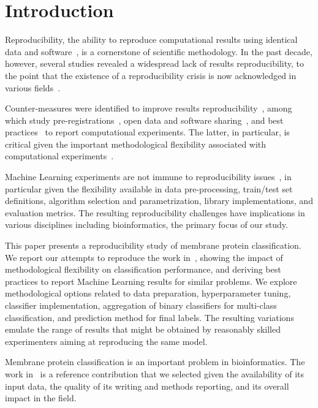 \section {Introduction}


Reproducibility, the ability to reproduce computational results using
identical data and software~\cite{peng2011reproducible}, is a cornerstone
of scientific methodology. In the past decade, however, several studies
revealed a widespread lack of results reproducibility, to the
point that the existence of a reproducibility crisis is now acknowledged in
various fields~\cite{baker2016reproducibility}.

Counter-measures were identified to improve results
reproducibility~\cite{sandve2013ten}, among which study
pre-registrations~\cite{chambers2015registered}, open data and software
sharing~\cite{wilkinson2016fair}, and best
practices~\cite{nichols2017best} to report computational experiments. The
latter, in particular, is critical given the important methodological
flexibility associated with computational
experiments~\cite{carp2012plurality}.

Machine Learning experiments are not immune to reproducibility
issues~\cite{raff2019step}, in particular given the flexibility available in
data pre-processing, train/test set definitions, algorithm selection and
parametrization, library implementations, and evaluation metrics. The resulting 
reproducibility challenges have implications in various
disciplines including bioinformatics, the primary focus of our study.

This paper presents a reproducibility study of membrane protein
classification. We report our attempts to reproduce the work
in~\cite{mishra2014prediction}, showing the impact of methodological
flexibility on classification performance, and deriving best practices to
report Machine Learning results for similar problems. We explore
methodological options related to data preparation, hyperparameter tuning,
classifier implementation, aggregation of binary classifiers for
multi-class classification, and prediction method for final labels. The
resulting variations emulate the range of results that might be obtained by
reasonably skilled experimenters aiming at reproducing the same model.

Membrane protein classification is an important problem in
bioinformatics. The work in~\cite{mishra2014prediction}
 is a reference contribution that we selected given
the availability of its input data, the quality of its writing and methods
reporting, and its overall impact in the field. 
